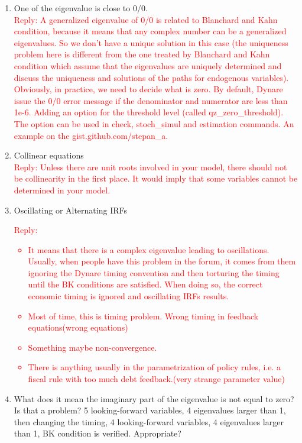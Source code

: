 \documentclass[10pt,math=newtx,citestyle=gb7714-2015,bibstyle=gb7714-2015]{elegantbook}
\begin{document}
{{{	\begin{enumerate}
		\item One of the eigenvalue is close to 0/0.\\
		\textcolor{red}{Reply: A generalized eigenvalue of 0/0 is related to Blanchard and Kahn condition, because it means that any complex number can be a generalized eigenvalues. So we don't have a unique solution in this case (the uniqueness problem here is different from the one treated by Blanchard and Kahn condition which assume that the eigenvalues are uniquely determined and discuss the uniqueness and solutions of the paths for endogenous variables). Obviously, in practice, we need to decide what is zero. By default, Dynare issue the 0/0 error message if the denominator and numerator are less than 1e-6. Adding an option for the threshold level (called qz\_zero\_threshold). The option can be used in check, stoch\_simul and estimation commands. An example on the gist.github.com/stepan\_a.}
		\item Collinear equations\\
		\textcolor{red}{Reply: Unless there are unit roots involved in your model, there should not be collinearity in the first place. It would imply that some variables cannot be determined in your model.}
		\item Oscillating or Alternating IRFs\\
		\textcolor{red}{Reply:
			\begin{itemize}
				\item It means that there is a complex eigenvalue leading to oscillations. Usually, when people have this problem in the forum, it comes from them ignoring the Dynare timing convention and then torturing the timing until the BK conditions are satisfied. When doing so, the correct economic timing is ignored and oscillating IRFs results.
				\item Most of time, this is timing problem. Wrong timing in feedback equations(wrong equations)
				\item Something maybe non-convergence.
				\item There is anything usually in the parametrization of policy rules, i.e. a fiscal rule with too much debt feedback.(very strange parameter value)
			\end{itemize}
		}
		\item What does it mean the imaginary part of the eigenvalue is not equal to zero? Is that a problem? 5 looking-forward variables, 4 eigenvalues larger than 1, then changing the timing, 4 looking-forward variables, 4 eigenvalues larger than 1, BK condition is verified. Appropriate?\\

\end{enumerate}}}}
\end{document}
